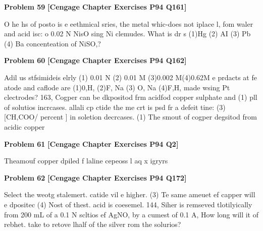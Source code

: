 \begin{problembox}
\textbf{Problem 59} \hfill \textbf{[Cengage Chapter Exercises P94 Q161]}
\label{q:ext-cng-th-59}

O he hs of posto is e eethmical sries, the
metal whic-does not iplace l, fom waler and acid isc:
o 0.02 N NisO sing Ni clemudes. What is dr s
(1)Hg
(2) AI
(3) Pb
(4) Ba
concenteation of NiSO,?
\end{problembox}

\begin{problembox}
\textbf{Problem 60} \hfill \textbf{[Cengage Chapter Exercises P94 Q162]}
\label{q:ext-cng-th-60}

Adil us stfsimideis elrly
(1) 0.01 N
(2) 0.01 M
(3)0.002 M(4)0.62M
e prdacts at fe atode and caflode are
(1)0,H,
(2)F, Na
(3) O, Na
(4)F,H,
made wsing Pt clectrodes?
163, Cogper can be dkpositod frm acidfod copper sulphate and
(1) pll of solutios incrcases.
allali cp ctide the me crt is psd fr
a defeit tine:
(3) [CH,COO/ percent ] in soletion decrcases.
(1) The smout of cogper degsitod from acidic copper
\end{problembox}

\begin{problembox}
\textbf{Problem 61} \hfill \textbf{[Cengage Chapter Exercises P94 Q2]}
\label{q:ext-cng-th-61}

Theamouf copper dpiled f laline cepeoss
l aq x igryrs
\end{problembox}

\begin{problembox}
\textbf{Problem 62} \hfill \textbf{[Cengage Chapter Exercises P94 Q172]}
\label{q:ext-cng-th-62}

Select the weotg stalemert.
catide vil e higher.
(3) Te same ameuet ef capper will e dpositec
(4) Nost of thest.
acid is coesemel.
144, Siher is remseved tlotilyically from 200 mL of a 0.1 N
scltios ef AgNO, by a cumest of 0.1 A, How long will it
of rebhet.
take to retove lhalf of the silver rom the solurios?
\end{problembox}

